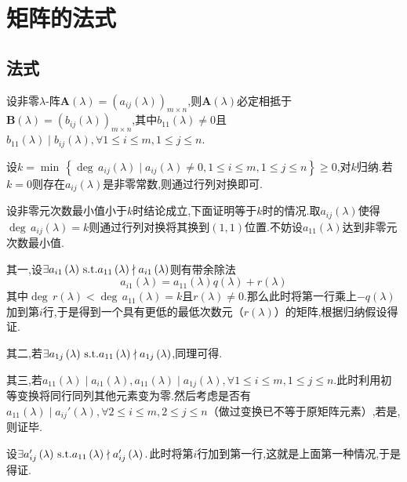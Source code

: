 \section{矩阵的法式}
\subsection{法式}
\begin{green}
    \begin{lemma}[首元素]\label{lem:首元素}
        设非零$\lambda$-阵$\bm{A}\left(\lambda\right)=\left(a_{ij}\left(\lambda\right)\right)_{m\times n}$,则$\bm{A}\left(\lambda\right)$必定相抵于$\bm{B}\left(\lambda\right)=\left(b_{ij}\left(\lambda\right)\right)_{m\times n}$,其中$b_{11}\left(\lambda\right)\neq 0$且$b_{11}\left(\lambda\right)\mid b_{ij}\left(\lambda\right),\forall 1\leqslant i\leqslant m,1\leqslant j\leqslant n.$
    \end{lemma}
    \begin{Proof}
    设$k=\min\,\left\{
        \deg\,a_{ij}\left(\lambda\right)\mid
        a_{ij}\left(\lambda\right)\neq 0,1\leqslant i\leqslant m,1\leqslant j\leqslant n
    \right\}\geqslant 0$,对$k$归纳.若$k=0$则存在$a_{ij}\left(\lambda\right)$是非零常数,则通过行列对换即可.

    设非零元次数最小值小于$k$时结论成立,下面证明等于$k$时的情况.取$a_{ij}\left(\lambda\right)$使得$\deg\,a_{ij}\left(\lambda\right)=k$则通过行列对换将其换到$\left(1,1\right)$位置.不妨设$a_{11}\left(\lambda\right)$达到非零元次数最小值.

    其一,设$\exists a_{i1}\left(\lambda\right)\,\textup{s.t.}a_{11}\left(\lambda\right)\nmid a_{i1}\left(\lambda\right)$则有带余除法
    \[
    a_{i1}\left(\lambda\right)=
    a_{11}\left(\lambda\right)q\left(\lambda\right)+r\left(\lambda\right)
    \]其中$\deg\,r\left(\lambda\right)<\deg\,a_{11}\left(\lambda\right)=k$且$r\left(\lambda\right)\neq 0.$那么此时将第一行乘上$-q\left(\lambda\right)$加到第$i$行,于是得到一个具有更低的最低次数元（$r\left(\lambda\right)$）的矩阵,根据归纳假设得证.

    其二,若$\exists a_{1j}\left(\lambda\right)\,\textup{s.t.}a_{11}\left(\lambda\right)\nmid a_{1j}\left(\lambda\right)$,同理可得.

    其三,若$a_{11}\left(\lambda\right)\mid a_{i1}\left(\lambda\right),a_{11}\left(\lambda\right)\mid a_{1j}\left(\lambda\right),\forall 1\leqslant i\leqslant m,1\leqslant j\leqslant n.$此时利用初等变换将同行同列其他元素变为零.然后考虑是否有$a_{11}\left(\lambda\right)\mid a_{ij}'\left(\lambda\right),\forall 2\leqslant i\leqslant m,2\leqslant j\leqslant n$（做过变换已不等于原矩阵元素）,若是,则证毕.

    设$\exists a_{ij}'\left(\lambda\right)\,\textup{s.t.}a_{11}\left(\lambda\right)\nmid a_{ij}'\left(\lambda\right).$此时将第$i$行加到第一行,这就是上面第一种情况,于是得证.
    \end{Proof}
\end{green}
